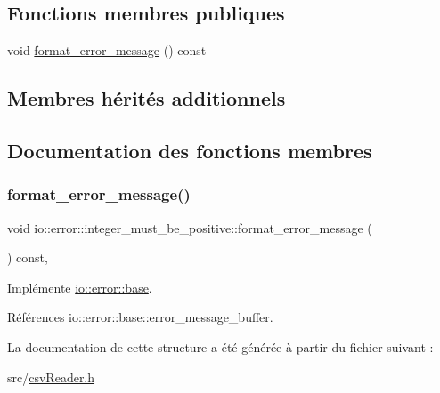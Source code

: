 \subsection*{Fonctions membres publiques}
\begin{DoxyCompactItemize}
\item 
void \hyperlink{structio_1_1error_1_1integer__must__be__positive_af6daaa02512141958a3eafd0c07232ef}{format\+\_\+error\+\_\+message} () const
\end{DoxyCompactItemize}
\subsection*{Membres hérités additionnels}


\subsection{Documentation des fonctions membres}
\mbox{\label{structio_1_1error_1_1integer__must__be__positive_af6daaa02512141958a3eafd0c07232ef}} 
\subsubsection{\texorpdfstring{format\+\_\+error\+\_\+message()}{format\_error\_message()}}
{\footnotesize\ttfamily void io\+::error\+::integer\+\_\+must\+\_\+be\+\_\+positive\+::format\+\_\+error\+\_\+message (\begin{DoxyParamCaption}{ }\end{DoxyParamCaption}) const\hspace{0.3cm}{\ttfamily [inline]}, {\ttfamily [virtual]}}



Implémente \hyperlink{structio_1_1error_1_1base_a7d9ff6a31b716a24f056cf8a3e15191d}{io\+::error\+::base}.



Références io\+::error\+::base\+::error\+\_\+message\+\_\+buffer.



La documentation de cette structure a été générée à partir du fichier suivant \+:\begin{DoxyCompactItemize}
\item 
src/\hyperlink{csvReader_8h}{csv\+Reader.\+h}\end{DoxyCompactItemize}
